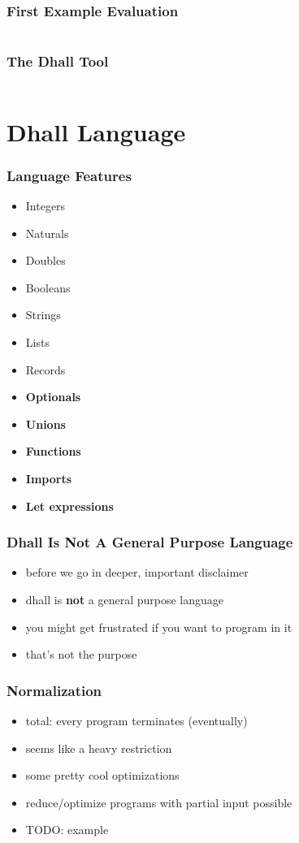 \documentclass{beamer}
\begin{document}
 \begin{frame}
   \frametitle{First Example \textemdash{} Evaluation}

   \inputminted[fontsize=\small]{text}{static-source/example.dhall.out}
 \end{frame}

 \begin{frame}
   \frametitle{The Dhall Tool}
   \inputminted[fontsize=\scriptsize]{text}{static-source/dhall-help.out}
 \end{frame}

 \section{Dhall Language}

 \begin{frame}
   \frametitle{Language Features}
   \begin{itemize}
   \item Integers
   \item Naturals
   \item Doubles
   \item Booleans
   \item Strings
   \item Lists
   \item Records
   \item \textbf{Optionals}
   \item \textbf{Unions}
   \item \textbf{Functions}
   \item \textbf{Imports}
   \item \textbf{Let expressions}
   \end{itemize}
 \end{frame}

 \begin{frame}
   \frametitle{Dhall Is Not A General Purpose Language}
   \begin{itemize}
   \item before we go in deeper, important disclaimer
   \item dhall is \textbf{not} a general purpose language
   \item you might get frustrated if you want to program in it
   \item that's not the purpose
   \end{itemize}
 \end{frame}

 \begin{frame}
   \frametitle{Normalization}
   \begin{itemize}
   \item total: every program terminates (eventually)
   \item seems like a heavy restriction
   \item some pretty cool optimizations
   \item reduce/optimize programs with partial input possible
   \item TODO: example
   \end{itemize}
 \end{frame}
\end{document}
